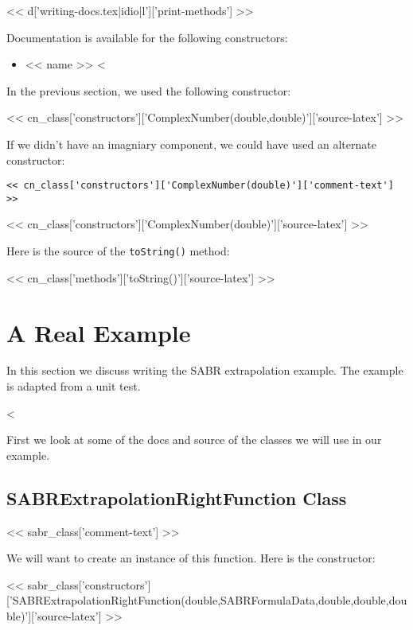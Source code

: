 << d['writing-docs.tex|idio|l']['print-methods'] >>

Documentation is available for the following constructors:

\begin{itemize}
<%
\item{<< name >>}
<%
\end{itemize}

In the previous section, we used the following constructor:

<< cn_class['constructors']['ComplexNumber(double,double)']['source-latex'] >>

If we didn't have an imagniary component, we could have used an alternate constructor:

\begin{Verbatim}
<< cn_class['constructors']['ComplexNumber(double)']['comment-text'] >>
\end{Verbatim}
<< cn_class['constructors']['ComplexNumber(double)']['source-latex'] >>

Here is the source of the \verb|toString()| method:

<< cn_class['methods']['toString()']['source-latex'] >>

\section{A Real Example}

In this section we discuss writing the SABR extrapolation example. The example
is adapted from a unit test.

<%

First we look at some of the docs and source of the classes we will use in our
example.

\subsection{SABRExtrapolationRightFunction Class}

<< sabr_class['comment-text'] >>

We will want to create an instance of this function. Here is the constructor:

<< sabr_class['constructors']['SABRExtrapolationRightFunction(double,SABRFormulaData,double,double,double)']['source-latex'] >>


